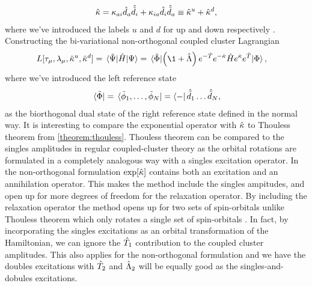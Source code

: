             \begin{align}
                \hat{\kappa}
                = \kappa_{ai} \hat{d}_{a}\hat{\tilde{d}}_{i}
                + \kappa_{ia} \hat{d}_{i}\hat{\tilde{d}}_{a}
                \equiv
                \hat{\kappa}^{u} + \hat{\kappa}^{d},
            \end{align}
            where we've introduced the labels $u$ and $d$ for up and down
            respectively \cite{rolf-nocc}.
            Constructing the bi-variational non-orthogonal coupled cluster
            Lagrangian
            \begin{align}
                L[\clustamp_{\mu}, \clustlamp_{\mu}, \nocc^{u}, \nocc^{d}]
                &= \mel*{\tilde{\Psi}}{\hamil}{\Psi}
                = \mel*{\tilde{\slat}}{
                    \para{\1 + \clustl}
                    e^{-\clust} e^{-\nocc}
                    \hamil
                    e^{\nocc} e^{\clust}
                }{\slat},
            \end{align}
            where we've introduced the left reference state
            \begin{align}
                \bra*{\tilde{\Phi}}
                = \bra*{\tilde{\phi}_1, \dots, \tilde{\phi}_N}
                = \bra{-}\hat{\tilde{d}}_{1}\dots\hat{\tilde{d}}_{N},
            \end{align}
            as the biorthogonal dual state of the right reference state defined
            in the normal way.
            It is interesting to compare the exponential operator with $\hat{\kappa}$
            to Thouless theorem from \autoref{theorem:thouless}.
            Thouless theorem can be compared to the singles amplitudes in
            regular coupled-cluster theory as the orbital rotations are
            formulated in a completely analogous way with a singles excitation
            operator.
            In the non-orthogonal formulation $\exp[\hat{\kappa}]$ contains both an
            excitation and an annihilation operator.
            This makes the method include the singles ampitudes, and open up for
            more degrees of freedom for the relaxation operator.
            By including the relaxation operator the method opens up for two
            sets of spin-orbitals unlike Thouless theorem which only rotates a
            single set of spin-orbitals \cite{helgaker-molecular}.
            In fact, by incorporating the singles excitations as an orbital
            transformation of the Hamiltonian, we can ignore the $\hat{T}_1$
            contribution to the coupled cluster amplitudes.
            This also applies for the non-orthogonal formulation and we have the
            doubles excitations with $\hat{T}_2$ and $\hat{\Lambda}_2$ will be equally
            good as the singles-and-dobules excitations.

